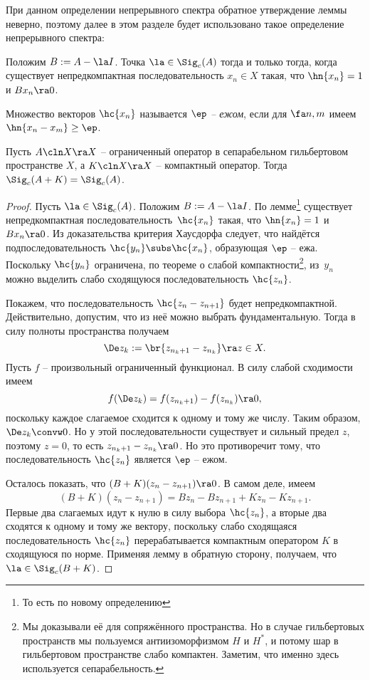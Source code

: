 \documentclass[a4paper]{article}
\begin{document}
При данном определении непрерывного спектра обратное утверждение леммы неверно, поэтому далее
в этом разделе будет использовано такое определение непрерывного спектра:

\begin{df}
Положим $B := A - \la I$. Точка $\la \in \Sig_c(A)$ тогда и только тогда, когда существует непредкомпактная
последовательность $x_n \in X$ такая, что $\hn{x_n} = 1$ и $B x_n \ra 0$.
\end{df}

\begin{df}
Множество векторов $\hc{x_n}$ называется \emph{$\ep$ -- ежом}, если для $\fa n, m$ имеем
$\hn{x_n - x_m} \ge \ep$.
\end{df}

\begin{theorem}
Пусть $A\cln X\ra X$ -- ограниченный оператор в сепарабельном гильбертовом пространстве $X$,
а $K\cln X \ra X$ -- компактный оператор. Тогда $\Sig_c(A + K) = \Sig_c(A)$.
\end{theorem}
\begin{proof}
Пусть $\la \in \Sig_c(A)$. Положим $B := A - \la I$. По лемме\footnote{То есть по новому определению}
существует непредкомпактная последовательность~$\hc{x_n}$ такая, что $\hn{x_n} = 1$ и $B x_n \ra 0$.
Из доказательства критерия Хаусдорфа следует, что найдётся подпоследовательность $\hc{y_n} \subs \hc{x_n}$,
образующая $\ep$ -- ежа. Поскольку $\hc{y_n}$ ограничена, по теореме о слабой компактности\footnote{Мы доказывали
её для сопряжённого пространства. Но в случае гильбертовых пространств мы пользуемся антиизоморфизмом $H$ и $H^*$,
и потому шар в гильбертовом пространстве слабо компактен. Заметим, что именно здесь используется сепарабельность.},
из~$y_n$ можно выделить слабо сходящуюся последовательность $\hc{z_n}$.

Покажем, что последовательность $\hc{z_n - z_{n+1}}$ будет непредкомпактной.
Действительно, допустим, что из неё можно выбрать фундаментальную.
Тогда в силу полноты пространства получаем
$$\De z_k := \br{z_{n_k+1} - z_{n_k}} \ra z \in X.$$
Пусть $f$ -- произвольный ограниченный функционал. В силу слабой сходимости имеем
$$f(\De z_k) = f(z_{n_k + 1}) - f(z_{n_k}) \ra 0,$$
поскольку каждое слагаемое сходится к одному и тому же числу.
Таким образом, $\De z_k \convw 0$. Но у этой последовательности существует и сильный
предел $z$, поэтому $z = 0$, то есть $z_{n_k+1} - z_{n_k} \ra 0$.
Но это противоречит тому, что последовательность $\hc{z_n}$ является $\ep$ -- ежом.

Осталось показать, что $(B + K)(z_n - z_{n+1}) \ra 0$. В самом деле, имеем
$$(B+K)(z_n - z_{n+1}) = B z_n - B z_{n+1} + K z_n - K z_{n+1}.$$
Первые два слагаемых идут к нулю в силу выбора $\hc{z_n}$, а вторые два
сходятся к одному и тому же вектору, поскольку слабо сходящаяся последовательность $\hc{z_n}$
перерабатывается компактным оператором $K$ в сходящуюся по норме.
Применяя лемму в обратную сторону, получаем, что $\la \in \Sig_c(B+K)$.
\end{proof}
\end{document}
